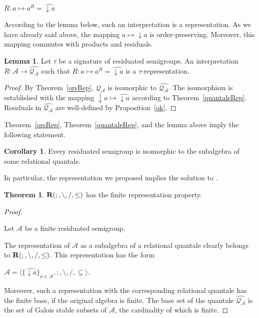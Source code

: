 \documentclass[a4paper]{article}
\theoremstyle{definition}
\theoremstyle{theorem}
\newtheorem{theorem}{Theorem}
\theoremstyle{proposition}
\theoremstyle{lemma}
\newtheorem{lemma}{Lemma}
\theoremstyle{ex}
\theoremstyle{corollary}
\newtheorem{corollary}{Corollary}
\theoremstyle{claim}
\begin{document}
\begin{center}
  $R : a \mapsto a^{R} = \widehat{\downarrow a}$
\end{center}

According to the lemma below, such an interpretation is a representation. As we have already said above, the mapping $a \mapsto \downarrow a$ is order-preserving. Moreover, this mapping commutes with products and residuals.

\begin{lemma}
  Let $\tau$ be a signature of residuated semigroups. An interpretation $R : \mathcal{A} \to \widehat{\mathcal{Q}_{\mathcal{A}}}$ such that $R : a \mapsto a^{R} = \widehat{\downarrow a}$ is a $\tau$-representation.
\end{lemma}

\begin{proof}
  By Theorem~\ref{orsRep}, $\mathcal{Q}_{\mathcal{A}}$ is isomorphic to $\widehat{\mathcal{Q}_{\mathcal{A}}}$. The isomorphism is established with the mapping $\downarrow{a} \mapsto \widehat{\downarrow a}$ according to Theorem~\ref{quantaleRep}.
  Residuals in $\widehat{\mathcal{Q}_{\mathcal{A}}}$ are well-defined by Proposition~\ref{ok}.
\end{proof}

Theorem~\ref{orsRep}, Theorem~\ref{quantaleRep}, and the lemma above imply the following statement.
\begin{corollary} \label{orsRep2}
  Every residuated semigroup is isomorphic to the subalgebra of some relational quantale.
\end{corollary}

In particular, the representation we proposed implies the solution to \cite[Problem 19.17]{hirsch2002relation}.
\begin{theorem} \label{solution}
  ${\bf R}(;, \setminus, /, \leq)$ has the finite representation property.
\end{theorem}

\begin{proof}
  $ $

  Let $\mathcal{A}$ be a finite residuated semigroup.

  The representation of $\mathcal{A}$ as a subalgebra of a relational quantale clearly belongs to ${\bf R}(;, \setminus, /, \leq)$. This representation has the form

\begin{center}
  $\widehat{\mathcal{A}} = \langle \{ \widehat{\downarrow a} \}_{a \in \mathcal{A}}, ;, \setminus, /, \subseteq \rangle$.
\end{center}

  Moreover, such a representation with the corresponding relational quantale has the finite base, if the original algebra is finite. The base set of the quantale $\widehat{\mathcal{Q}_{\mathcal{A}}}$ is the set of Galois stable subsets of $\mathcal{A}$, the cardinality of which is finite.
\end{proof}
\end{document}
